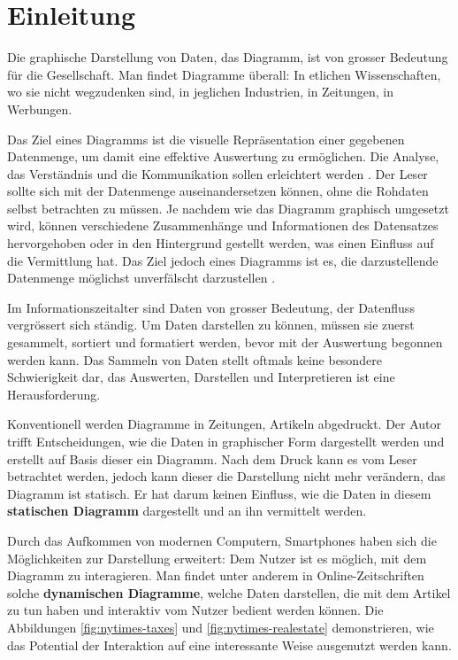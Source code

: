 \chapter{Einleitung}
Die graphische Darstellung von Daten, das Diagramm, ist von grosser Bedeutung für die Gesellschaft. Man findet Diagramme überall: In etlichen Wissenschaften, wo sie nicht wegzudenken sind, in jeglichen Industrien, in Zeitungen, in Werbungen.


Das Ziel eines Diagramms ist die visuelle Repräsentation einer gegebenen Datenmenge, um damit eine effektive Auswertung zu ermöglichen. Die Analyse, das Verständnis und die Kommunikation sollen erleichtert werden \cite{viz}. Der Leser sollte sich mit der Datenmenge auseinandersetzen können, ohne die Rohdaten selbst betrachten zu müssen. Je nachdem wie das Diagramm graphisch umgesetzt wird, können verschiedene Zusammenhänge und Informationen des Datensatzes hervorgehoben oder in den Hintergrund gestellt werden, was einen Einfluss auf die Vermittlung hat. 
Das Ziel jedoch eines Diagramms ist es, die darzustellende Datenmenge möglichst unverfälscht darzustellen \cite{ziel}. %

Im Informationszeitalter sind Daten von grosser Bedeutung, der Datenfluss vergrössert sich ständig. Um Daten darstellen zu können, müssen sie zuerst gesammelt, sortiert und formatiert werden, bevor mit der Auswertung begonnen werden kann. Das Sammeln von Daten stellt oftmals keine besondere Schwierigkeit dar, das Auswerten, Darstellen und Interpretieren ist eine Herausforderung.

Konventionell werden Diagramme in Zeitungen, Artikeln abgedruckt. Der Autor trifft Entscheidungen, wie die Daten in graphischer Form dargestellt werden und erstellt auf Basis dieser ein Diagramm. Nach dem Druck kann es vom Leser betrachtet werden, jedoch kann dieser die Darstellung nicht mehr verändern, das Diagramm ist statisch. Er hat darum keinen Einfluss, wie die Daten in diesem \textbf{statischen Diagramm} dargestellt und an ihn vermittelt werden.

Durch das Aufkommen von modernen Computern, Smartphones haben sich die Möglichkeiten zur Darstellung erweitert: Dem Nutzer ist es möglich, mit dem Diagramm zu interagieren. Man findet unter anderem in Online-Zeitschriften solche \textbf{dynamischen Diagramme}, welche Daten darstellen, die mit dem Artikel zu tun haben und interaktiv vom Nutzer bedient werden können. Die Abbildungen \ref{fig:nytimes-taxes} und \ref{fig:nytimes-realestate} demonstrieren, wie das Potential der Interaktion auf eine interessante Weise ausgenutzt werden kann.

